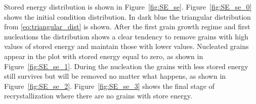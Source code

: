 Stored energy distribution is shown in Figure~\ref{fig:SE_se}. Figure~\ref{fig:SE_se_0} shows the initial condition distribution. 
In dark blue the triangular distribution from \eqref{eq:triangular_dist} is shown. After the first grain growth regime and first nucleations the distribution shows a clear tendency to remove grains with high values of stored energy and maintain those with lower values. Nucleated grains appear in the plot with stored energy equal to zero, as shown in Figure~\ref{fig:SE_se_1}. During the nucleation the grains with less stored energy still survives but will be removed no matter what happens, as shown in Figure~\ref{fig:SE_se_2}. Figure~\ref{fig:SE_se_3} shows the final stage of recrystallization where there are no grains with store energy.

\begin{figure}[ht]
    \centering
\end{figure}
